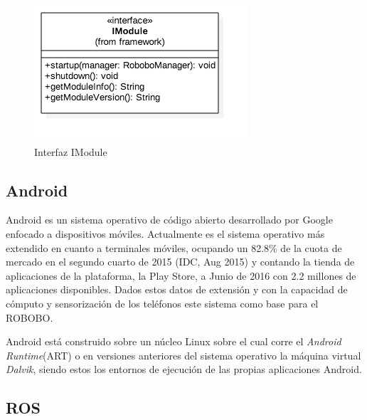 \begin{figure}
	\centering
	\includegraphics[width=0.7\linewidth]{imagenes/diagramas/IModule.png}
	\caption{Interfaz IModule}
	\label{fig:imodule}
\end{figure}
\subsection{Android}
\label{subsec:android}


Android es un sistema operativo de código abierto desarrollado por Google enfocado a dispositivos móviles. Actualmente es el sistema operativo más extendido en cuanto a terminales móviles, ocupando un 82.8\% de la cuota de mercado en el segundo cuarto de 2015 (IDC, Aug 2015) y contando la tienda de aplicaciones de la plataforma, la  Play Store, a Junio de 2016 con 2.2 millones de aplicaciones disponibles.
Dados estos datos de extensión y con la capacidad de cómputo y sensorización de los teléfonos  este sistema como base para el ROBOBO.

Android está construido sobre un núcleo Linux sobre el cual corre el \textit{Android Runtime}(ART) o en versiones anteriores del sistema operativo la máquina virtual \textit{Dalvik}, siendo estos los entornos de ejecución de las propias aplicaciones Android.


\subsection{ROS}
\label{subsec:ros}

